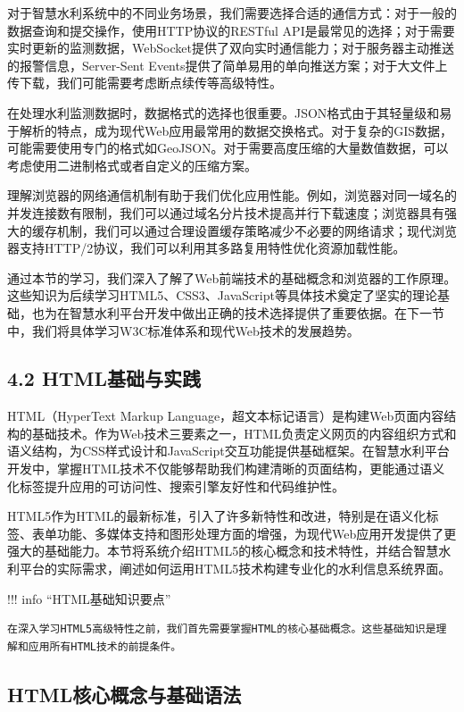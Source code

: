对于智慧水利系统中的不同业务场景，我们需要选择合适的通信方式：对于一般的数据查询和提交操作，使用HTTP协议的RESTful API是最常见的选择；对于需要实时更新的监测数据，WebSocket提供了双向实时通信能力；对于服务器主动推送的报警信息，Server-Sent Events提供了简单易用的单向推送方案；对于大文件上传下载，我们可能需要考虑断点续传等高级特性。

在处理水利监测数据时，数据格式的选择也很重要。JSON格式由于其轻量级和易于解析的特点，成为现代Web应用最常用的数据交换格式。对于复杂的GIS数据，可能需要使用专门的格式如GeoJSON。对于需要高度压缩的大量数值数据，可以考虑使用二进制格式或者自定义的压缩方案。

理解浏览器的网络通信机制有助于我们优化应用性能。例如，浏览器对同一域名的并发连接数有限制，我们可以通过域名分片技术提高并行下载速度；浏览器具有强大的缓存机制，我们可以通过合理设置缓存策略减少不必要的网络请求；现代浏览器支持HTTP/2协议，我们可以利用其多路复用特性优化资源加载性能。

通过本节的学习，我们深入了解了Web前端技术的基础概念和浏览器的工作原理。这些知识为后续学习HTML5、CSS3、JavaScript等具体技术奠定了坚实的理论基础，也为在智慧水利平台开发中做出正确的技术选择提供了重要依据。在下一节中，我们将具体学习W3C标准体系和现代Web技术的发展趋势。

\subsection{4.2 HTML基础与实践}\label{htmlux57faux7840ux4e0eux5b9eux8df5}

HTML（HyperText Markup Language，超文本标记语言）是构建Web页面内容结构的基础技术。作为Web技术三要素之一，HTML负责定义网页的内容组织方式和语义结构，为CSS样式设计和JavaScript交互功能提供基础框架。在智慧水利平台开发中，掌握HTML技术不仅能够帮助我们构建清晰的页面结构，更能通过语义化标签提升应用的可访问性、搜索引擎友好性和代码维护性。

HTML5作为HTML的最新标准，引入了许多新特性和改进，特别是在语义化标签、表单功能、多媒体支持和图形处理方面的增强，为现代Web应用开发提供了更强大的基础能力。本节将系统介绍HTML5的核心概念和技术特性，并结合智慧水利平台的实际需求，阐述如何运用HTML5技术构建专业化的水利信息系统界面。

!!! info ``HTML基础知识要点''

\begin{verbatim}
在深入学习HTML5高级特性之前，我们首先需要掌握HTML的核心基础概念。这些基础知识是理解和应用所有HTML技术的前提条件。
\end{verbatim}

\subsection{HTML核心概念与基础语法}\label{htmlux6838ux5fc3ux6982ux5ff5ux4e0eux57faux7840ux8bedux6cd5}

